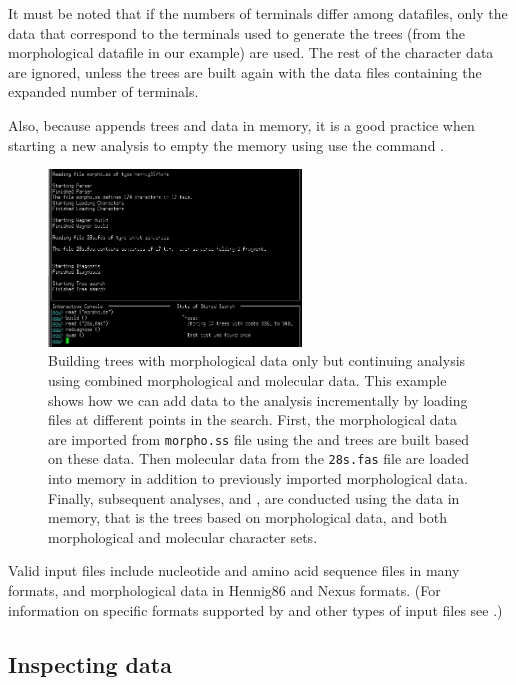 It must be noted that if the numbers of terminals differ among datafiles, only the data that correspond to the terminals used to generate the trees (from the morphological datafile in our example) are used. The rest of the character data are ignored, unless the trees are built again with the data files containing the expanded number of terminals.

Also, because \poy appends trees and data in memory, it is a good practice when starting a new analysis to empty the memory using use the command .

\begin{figure}[]
    \begin{center}
        \includegraphics[width=0.6\textwidth]{doc/figures/reading_example2.jpg}
    \end{center}
    \caption{Building trees with morphological data only but continuing analysis using combined morphological and molecular data. This example shows how we can add data to the analysis incrementally by loading files at different points in the search. First, the morphological data are imported from \texttt{morpho.ss} file using  the and trees are built based on these data. Then molecular data from the \texttt{28s.fas} file are loaded into memory in addition to previously imported morphological data. Finally, subsequent analyses,  and , are conducted using the data in memory, that is the trees based on morphological data, and both morphological and molecular character sets.}
    \label{fig:reading_example2}
\end{figure}

Valid input files include nucleotide and amino acid sequence files in many formats,
and morphological data in Hennig86 and Nexus formats. (For information on specific formats supported by \poy and other types of input files see .)

\subsection{Inspecting data}

